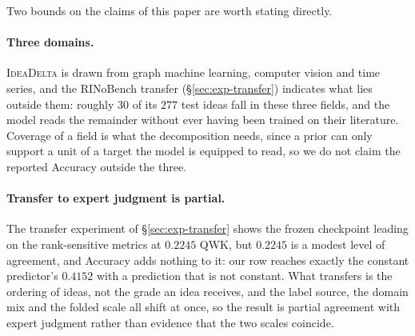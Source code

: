 Two bounds on the claims of this paper are worth stating directly.

\paragraph{Three domains.}
\textsc{IdeaDelta} is drawn from graph machine learning, computer vision and
time series, and the RINoBench transfer (\S\ref{sec:exp-transfer}) indicates
what lies outside them:
roughly $30$ of its $277$ test ideas fall in these three fields, and the model
reads the remainder without ever having been trained on their literature.
Coverage of a field is what the decomposition needs, since a prior can only
support a unit of a target the model is equipped to read, so we do not claim
the reported Accuracy outside the three.

\paragraph{Transfer to expert judgment is partial.}
The transfer experiment of \S\ref{sec:exp-transfer} shows the frozen checkpoint
leading on the rank-sensitive metrics at $0.2245$ QWK, but $0.2245$ is a modest
level of agreement, and Accuracy adds nothing to it: our row reaches exactly the
constant predictor's $0.4152$ with a prediction that is not constant. What
transfers is the ordering of ideas, not the grade an idea receives, and the
label source, the domain mix and the folded scale all shift at once, so the
result is partial agreement with expert judgment rather than evidence that the
two scales coincide.

